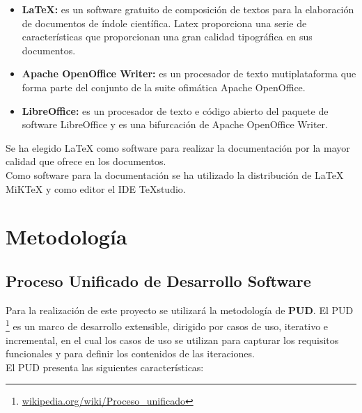 \documentclass[12pt, a4paper]{book}
\begin{document}
\begin{itemize}
	\item \textbf{LaTeX:} es un software gratuito de composición de textos para la elaboración de documentos de índole científica. Latex proporciona una serie de características que proporcionan una gran calidad tipográfica en sus documentos.
	
	\item \textbf{Apache OpenOffice Writer:} es un procesador de texto mutiplataforma que forma parte del conjunto de la suite ofimática Apache OpenOffice.
	
	\item \textbf{LibreOffice:} es un procesador de texto e código abierto del paquete de software LibreOffice y es una bifurcación de Apache OpenOffice Writer.
	
\end{itemize}

Se ha elegido LaTeX como software para realizar la documentación por la mayor calidad que ofrece en los documentos. \\

Como software para la documentación se ha utilizado la distribución de LaTeX MiKTeX y como editor el IDE TeXstudio.

\newpage



\chapter{Metodología}

\section{Proceso Unificado de Desarrollo Software}
Para la realización de este proyecto se utilizará la metodología de \textbf{ \gls{PUD}}. El \gls{PUD} \footnote{\href{https://es.wikipedia.org/wiki/Proceso_unificado}{wikipedia.org/wiki/Proceso\_unificado}} es un marco de desarrollo extensible, dirigido por casos de uso, iterativo e incremental, en el cual los casos de uso se utilizan para capturar los requisitos funcionales y para definir los contenidos de las iteraciones.\\

El \gls{PUD} presenta las siguientes características:
\end{document}
